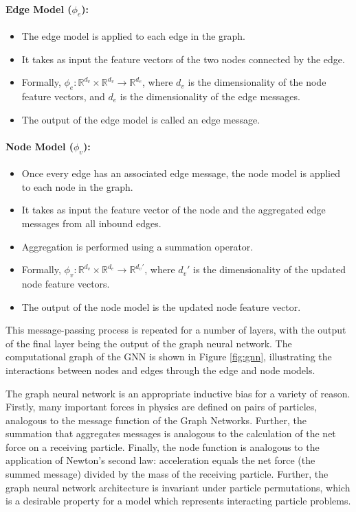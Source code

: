 \documentclass[11pt]{article}
\begin{document}
\paragraph*{Edge Model ($\phi_e$):}
   \begin{itemize}
       \item The edge model is applied to each edge in the graph.
       \item It takes as input the feature vectors of the two nodes connected by the edge.
       \item Formally, $\phi_e : \mathbb{R}^{d_v} \times \mathbb{R}^{d_v} \rightarrow \mathbb{R}^{d_e}$, where $d_v$ is the dimensionality of the node feature vectors, and $d_e$ is the dimensionality of the edge messages.
       \item The output of the edge model is called an edge message.
   \end{itemize}

\paragraph*{Node Model ($\phi_v$):}
   \begin{itemize}
       \item Once every edge has an associated edge message, the node model is applied to each node in the graph.
       \item It takes as input the feature vector of the node and the aggregated edge messages from all inbound edges.
       \item Aggregation is performed using a summation operator.
       \item Formally, $\phi_v : \mathbb{R}^{d_v} \times \mathbb{R}^{d_e} \rightarrow \mathbb{R}^{d_v'}$, where $d_v'$ is the dimensionality of the updated node feature vectors.
       \item The output of the node model is the updated node feature vector.
   \end{itemize}

This message-passing process is repeated for a number of layers, with the output of the final layer being the output of the graph neural network. The computational graph of the GNN is shown in Figure \ref{fig:gnn}, illustrating the interactions between nodes and edges through the edge and node models.

The graph neural network is an appropriate inductive bias for a variety of reason. Firstly, many important forces in physics are defined on pairs of particles, analogous to the message function of the Graph Networks. Further, the summation that aggregates messages is analogous to the calculation of the net force on a receiving particle. Finally, the node function is analogous to the application of Newton's second law: acceleration equals the net force (the summed message) divided by the mass of the receiving particle. Further, the graph neural network architecture is invariant under particle permutations, which is a desirable property for a model which represents interacting particle problems. 
\end{document}
